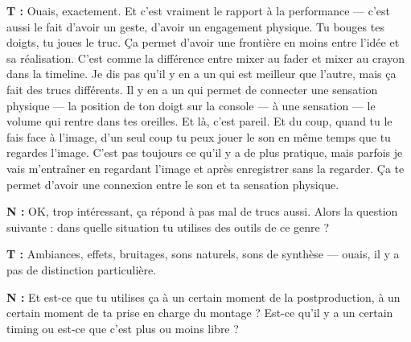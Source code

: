 ﻿\documentclass[12pt]{article}
\begin{document}
\textbf{T :} Ouais, exactement. Et c'est vraiment le rapport à la performance — c'est aussi le fait d'avoir un geste, d'avoir un engagement physique. Tu bouges tes doigts, tu joues le truc. Ça permet d'avoir une frontière en moins entre l'idée et sa réalisation. C'est comme la différence entre mixer au fader et mixer au crayon dans la timeline. Je dis pas qu'il y en a un qui est meilleur que l'autre, mais ça fait des trucs différents. Il y en a un qui permet de connecter une sensation physique — la position de ton doigt sur la console — à une sensation — le volume qui rentre dans tes oreilles. Et là, c'est pareil. Et du coup, quand tu le fais face à l'image, d'un seul coup tu peux jouer le son en même temps que tu regardes l'image. C'est pas toujours ce qu'il y a de plus pratique, mais parfois je vais m'entraîner en regardant l'image et après enregistrer sans la regarder. Ça te permet d'avoir une connexion entre le son et ta sensation physique. 

\textbf{N :} OK, trop intéressant, ça répond à pas mal de trucs aussi. Alors la question suivante : dans quelle situation tu utilises des outils de ce genre ? 

\textbf{T :} Ambiances, effets, bruitages, sons naturels, sons de synthèse — ouais, il y a pas de distinction particulière. 

\textbf{N :} Et est-ce que tu utilises ça à un certain moment de la postproduction, à un certain moment de ta prise en charge du montage ? Est-ce qu'il y a un certain timing ou est-ce que c'est plus ou moins libre ? 
\end{document}
